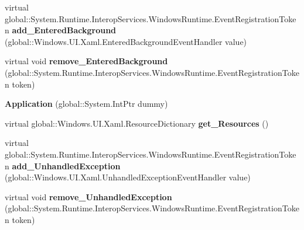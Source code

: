 \begin{DoxyCompactItemize}
\item 
\mbox{\label{class_windows_1_1_u_i_1_1_xaml_1_1_application_a1ea6c3f747b180eb0e3d0485f1427ce1}} 
virtual global\+::\+System.\+Runtime.\+Interop\+Services.\+Windows\+Runtime.\+Event\+Registration\+Token {\bfseries add\+\_\+\+Entered\+Background} (global\+::\+Windows.\+U\+I.\+Xaml.\+Entered\+Background\+Event\+Handler value)
\item 
\mbox{\label{class_windows_1_1_u_i_1_1_xaml_1_1_application_a09062e367c18c1fcc02e683a68c8f793}} 
virtual void {\bfseries remove\+\_\+\+Entered\+Background} (global\+::\+System.\+Runtime.\+Interop\+Services.\+Windows\+Runtime.\+Event\+Registration\+Token token)
\item 
\mbox{\label{class_windows_1_1_u_i_1_1_xaml_1_1_application_a90eb3297ba9bfe5ad1c0d720af9b8066}} 
{\bfseries Application} (global\+::\+System.\+Int\+Ptr dummy)
\item 
\mbox{\label{class_windows_1_1_u_i_1_1_xaml_1_1_application_a34b9be50f5ce3d03d0f641d57ed74c72}} 
virtual global\+::\+Windows.\+U\+I.\+Xaml.\+Resource\+Dictionary {\bfseries get\+\_\+\+Resources} ()
\item 
\mbox{\label{class_windows_1_1_u_i_1_1_xaml_1_1_application_a3fdd0d36fb6e5880c92fd8b205ab9cda}} 
virtual global\+::\+System.\+Runtime.\+Interop\+Services.\+Windows\+Runtime.\+Event\+Registration\+Token {\bfseries add\+\_\+\+Unhandled\+Exception} (global\+::\+Windows.\+U\+I.\+Xaml.\+Unhandled\+Exception\+Event\+Handler value)
\item 
\mbox{\label{class_windows_1_1_u_i_1_1_xaml_1_1_application_ab4bbcd1b2fae8d35eae530ebe85732ba}} 
virtual void {\bfseries remove\+\_\+\+Unhandled\+Exception} (global\+::\+System.\+Runtime.\+Interop\+Services.\+Windows\+Runtime.\+Event\+Registration\+Token token)
\item 
\mbox{\label{class_windows_1_1_u_i_1_1_xaml_1_1_application_ac22db715c72a7c090a65a2657417c4e6}} 

\end{DoxyCompactItemize}
